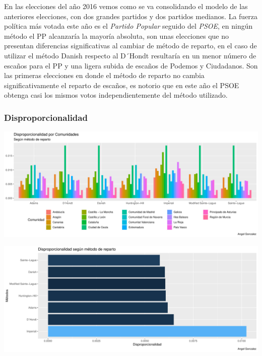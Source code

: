 \documentclass[12pt,a4paper,]{book}
\numberwithin{dummy}{section}
\theoremstyle{ocrenumbox}
\theoremstyle{blacknumex}
\theoremstyle{blacknumbox}
\theoremstyle{ocrenum}
\theoremstyle{ocrenum}
\begin{document}
En las elecciones del año 2016 vemos como se va consolidando el modelo
de las anteriores elecciones, con dos grandes partidos y dos partidos
medianos. La fuerza política más votada este año es el \emph{Partido
Popular} seguido del \emph{PSOE}, en ningún método el PP alcanzaría la
mayoría absoluta, son unas elecciones que no presentan diferencias
significativas al cambiar de método de reparto, en el caso de utilizar
el método Danish respecto al D´Hondt resultaría en un menor número de
escaños para el PP y una ligera subida de escaños de Podemos y
Ciudadanos. Son las primeras elecciones en donde el método de reparto no
cambia significativamente el reparto de escaños, es notorio que en este
año el PSOE obtenga casi los mismos votos independientemente del método
utilizado.

\hypertarget{disproporcionalidad-11}{%
\subsubsection{Disproporcionalidad}\label{disproporcionalidad-11}}

\begin{center}\includegraphics[width=0.95\linewidth]{figurasR/unnamed-chunk-168-1} \end{center}

\begin{center}\includegraphics[width=0.95\linewidth]{figurasR/unnamed-chunk-168-2} \end{center}
\end{document}
